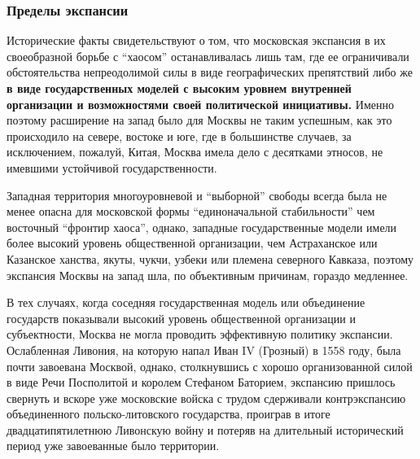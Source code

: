  
 
 
 
 

\subsubsection{Пределы экспансии}

Исторические факты свидетельствуют о том, что московская экспансия в их
своеобразной борьбе с \enquote{хаосом} останавливалась лишь там, где ее ограничивали
обстоятельства непреодолимой силы в виде географических препятствий либо же \textbf{в
виде государственных моделей с высоким уровнем внутренней организации и
возможностями своей политической инициативы.} Именно поэтому расширение на запад
было для Москвы не таким успешным, как это происходило на севере, востоке и
юге, где в большинстве случаев, за исключением, пожалуй, Китая, Москва имела
дело с десятками этносов, не имевшими устойчивой государственности.

Западная территория многоуровневой и \enquote{выборной} свободы всегда была не менее
опасна для московской формы \enquote{единоначальной стабильности} чем восточный
\enquote{фронтир хаоса}, однако, западные государственные модели имели более высокий
уровень общественной организации, чем Астраханское или Казанское ханства,
якуты, чукчи, узбеки или племена северного Кавказа, поэтому экспансия Москвы на
запад шла, по объективным причинам, гораздо медленнее.

В тех случаях, когда соседняя государственная модель или объединение государств
показывали высокий уровень общественной организации и субъектности, Москва не
могла проводить эффективную политику экспансии. Ослабленная Ливония, на которую
напал Иван IV (Грозный) в 1558 году, была почти завоевана Москвой, однако,
столкнувшись с хорошо организованной силой в виде Речи Посполитой и королем
Стефаном Баторием, экспансию пришлось свернуть и вскоре уже московские войска с
трудом сдерживали контрэкспансию объединенного польско-литовского государства,
проиграв в итоге двадцатипятилетнюю Ливонскую войну и потеряв на длительный
исторический период уже завоеванные было территории.

